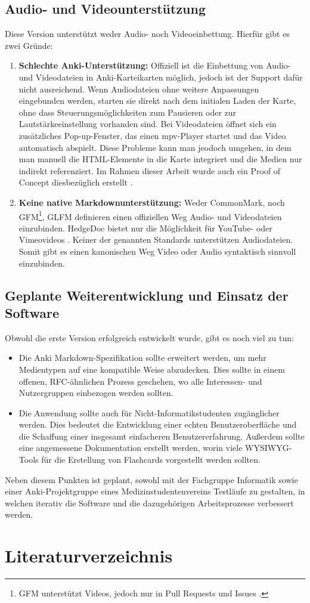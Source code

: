 \documentclass[ngerman]{article}
\begin{document}
\subsection{Audio- und Videounterst\"utzung}
Diese Version unterstützt weder Audio- noch Videoeinbettung. Hierfür gibt es zwei Gründe:
\begin{enumerate}
  \item \textbf{Schlechte Anki-Unterstützung:} Offiziell ist die Einbettung von Audio- und Videodateien in Anki-Karteikarten möglich, jedoch ist der Support dafür nicht ausreichend. Wenn Audiodateien ohne weitere Anpassungen eingebunden werden, starten sie direkt nach dem initialen Laden der Karte, ohne dass Steuerungsmöglichkeiten zum Pausieren oder zur Lautstärkeeinstellung vorhanden sind. Bei Videodateien öffnet sich ein zusätzliches Pop-up-Fenster, das einen mpv-Player startet und das Video automatisch abspielt. Diese Probleme kann man jeodoch umgehen, in dem man manuell die HTML-Elemente in die Karte integriert und die Medien nur indirekt referenziert. Im Rahmen dieser Arbeit wurde auch ein Proof of Concept diesbezüglich erstellt \cite{AnkiPoC}.
  \item \textbf{Keine native Markdownunterstützung:} Weder CommonMark, noch GFM\footnote{GFM unterstützt Videos, jedoch nur in Pull Requests und Issues \cite{GFMVid}.}, GLFM definieren einen offiziellen Weg Audio- und Videodateien einzubinden. HedgeDoc bietet nur die Möglichkeit für YouTube- oder Vimeovideos \cite{HFM2}. Keiner der genannten Standards unterstützen Audiodateien. Somit gibt es einen kanonischen Weg Video oder Audio syntaktisch sinnvoll einzubinden.
\end{enumerate}
\subsection{Geplante Weiterentwicklung und Einsatz der Software}
Obwohl die erste Version erfolgreich entwickelt wurde, gibt es noch viel zu tun:

\begin{itemize}
  \item Die Anki Markdown-Spezifikation sollte erweitert werden, um mehr Medientypen auf eine kompatible Weise abzudecken. Dies sollte in einem offenen, RFC-ähnlichen Prozess geschehen, wo alle Interessen- und Nutzergruppen einbezogen werden sollten.
  \item Die Anwendung sollte auch für Nicht-Informatikstudenten zugänglicher werden. Dies bedeutet die Entwicklung einer echten Benutzeroberfläche und die Schaffung einer insgesamt einfacheren Benutzererfahrung. Außerdem sollte eine angemessene Dokumentation erstellt werden, worin viele WYSIWYG-Tools für die Erstellung von Flashcards vorgestellt werden sollten.
\end{itemize}

Neben diesem Punkten ist geplant, sowohl mit der Fachgruppe Informatik sowie einer Anki-Projektgruppe eines Medizinstudentenvereins Testläufe zu gestalten, in welchen iterativ die Software und die dazugehörigen Arbeitsprozesse verbessert werden.
\newpage
\section{Literaturverzeichnis}
\printbibliography
\end{document}
